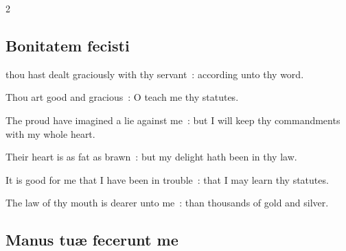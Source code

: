 \begin{multicols}{2}

\subsection{Bonitatem fecisti}


 thou hast dealt graciously with thy servant~: according unto thy word.\par
{}
Thou art good and gracious~: O teach me thy statutes.\par
{}The proud have imagined a lie against me~: but I will keep thy commandments with my whole heart.\par
{}Their heart is as fat as brawn~: but my delight hath been in thy law.\par
{}It is good for me that I have been in trouble~: that I may learn thy statutes.\par
{}The law of thy mouth is dearer unto me~: than thousands of gold and silver.\par

\subsection{Manus tu{\ae} fecerunt me}


\end{multicols}
